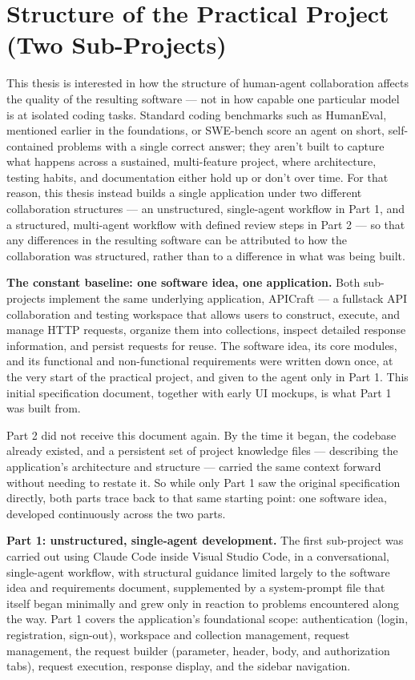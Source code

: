 \section{Structure of the Practical Project (Two Sub-Projects)}

This thesis is interested in how the structure of human-agent collaboration affects the quality of the resulting software --- not in how capable one particular model is at isolated coding tasks. Standard coding benchmarks such as HumanEval, mentioned earlier in the foundations, or SWE-bench score an agent on short, self-contained problems with a single correct answer; they aren't built to capture what happens across a sustained, multi-feature project, where architecture, testing habits, and documentation either hold up or don't over time. For that reason, this thesis instead builds a single application under two different collaboration structures --- an unstructured, single-agent workflow in Part 1, and a structured, multi-agent workflow with defined review steps in Part 2 --- so that any differences in the resulting software can be attributed to how the collaboration was structured, rather than to a difference in what was being built.

\textbf{The constant baseline: one software idea, one application.} Both sub-projects implement the same underlying application, APICraft --- a fullstack API collaboration and testing workspace that allows users to construct, execute, and manage HTTP requests, organize them into collections, inspect detailed response information, and persist requests for reuse. The software idea, its core modules, and its functional and non-functional requirements were written down once, at the very start of the practical project, and given to the agent only in Part 1. This initial specification document, together with early UI mockups, is what Part 1 was built from.

Part 2 did not receive this document again. By the time it began, the codebase already existed, and a persistent set of project knowledge files --- describing the application's architecture and structure --- carried the same context forward without needing to restate it. So while only Part 1 saw the original specification directly, both parts trace back to that same starting point: one software idea, developed continuously across the two parts.

\textbf{Part 1: unstructured, single-agent development.} The first sub-project was carried out using Claude Code inside Visual Studio Code, in a conversational, single-agent workflow, with structural guidance limited largely to the software idea and requirements document, supplemented by a system-prompt file that itself began minimally and grew only in reaction to problems encountered along the way. Part 1 covers the application's foundational scope: authentication (login, registration, sign-out), workspace and collection management, request management, the request builder (parameter, header, body, and authorization tabs), request execution, response display, and the sidebar navigation.

